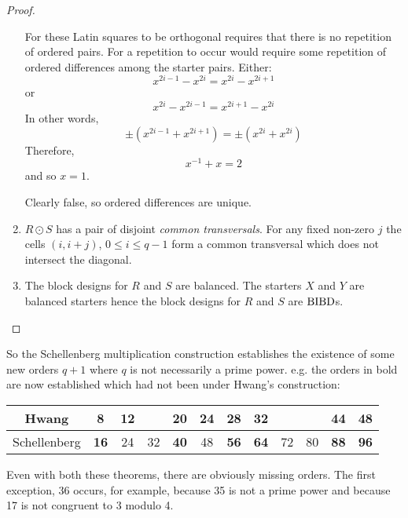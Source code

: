 \begin{proof}
\begin{enumerate}
{      For these Latin
      squares to be orthogonal requires that there is no
      repetition of ordered pairs.  For a repetition to
      occur would require some repetition of ordered
      differences among the starter pairs.  Either:
      \begin{equation}
        x^{2i - 1} - x^{2i} = x^{2i} - x^{2i + 1}
      \end{equation}
      or
      \begin{equation}
        x^{2i} - x^{2i-1} = x^{2i+1} - x^{2i}
      \end{equation}
      In other words,
      \begin{equation}
       \pm (x^{2i - 1} + x^{2i + 1}) = \pm (x^{2i} + x^{2i})
      \end{equation}
      Therefore,
      \begin{equation}
        x^{-1} + x = 2
      \end{equation}
      and so $x = 1$.

      Clearly false, so ordered differences are unique.}
  \item{$R \odot S$ has a pair of disjoint \emph{common transversals}.
      For any fixed non-zero $j$ the cells
      $(i, i + j)$, $0 \leq i \leq q - 1$ form a common
      transversal which does not intersect the diagonal.}
  \item{The block designs for $R$ and $S$ are balanced. The
      starters $X$ and $Y$ are balanced starters hence the
      block designs for $R$ and $S$ are $\operatorname{BIBD}$s.}
  \end{enumerate}
\end{proof}

So the Schellenberg multiplication construction establishes the existence of some new orders $q + 1$ where $q$ is not necessarily a prime power. e.g. the orders in bold are now established which had not been under Hwang’s construction:

\begin{center}
  \begin{tabular}{|c|c|c|c|c|c|c|c|c|c|c|c|}
  \hline
     Hwang     &  8 & 12 &    & 20 & 24 & 28 & 32 &    &    & 44 & 48 \\ \hline
  Schellenberg & \textbf{16} & 24 & 32 & \textbf{40} & 48 & \textbf{56} & \textbf{64} & 72 & 80 & \textbf{88} & \textbf{96} \\ \hline
  \end{tabular}
\end{center}

Even with both these theorems, there are obviously missing orders.
The first exception, 36 occurs, for example, because 35 is not a prime power and because 17 is not congruent to 3 modulo 4.

